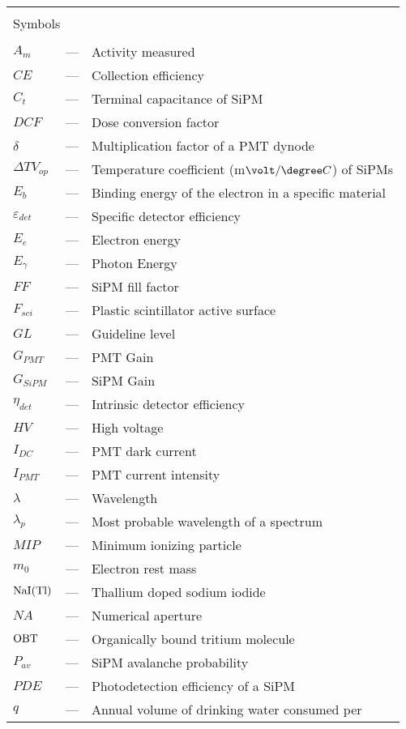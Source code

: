 \begin{longtable}{p{25mm} c p{120mm} }
\\
\\
\multicolumn{3}{l}{Symbols}\\
\\
$A_{m}$ & --- & Activity measured\\
$CE$ & --- & Collection efficiency\\
$C_t$ & --- & Terminal capacitance of SiPM\\
$DCF$ & --- & Dose conversion factor\\
$\delta$ & --- & Multiplication factor of a PMT dynode\\
$\Delta TV_{op}$ & --- & Temperature coefficient (m$\volt/\degree C$) of SiPMs\\
$E_b$ & --- & Binding energy of the electron in a specific material\\
$\varepsilon_{det}$ & --- & Specific detector efficiency\\
$E_e$ & --- & Electron energy\\
$E_\gamma$ & --- & Photon Energy\\
$FF$ & --- & SiPM fill factor\\
$F_{sci}$ & --- & Plastic scintillator active surface\\
$GL$ & --- & Guideline level\\
$G_{PMT}$ & --- & PMT Gain\\
$G_{SiPM}$ & --- & SiPM Gain\\
$\eta_{det}$ & --- & Intrinsic detector efficiency\\
$HV$ & --- & High voltage\\
$I_{DC}$ & --- & PMT dark current\\
$I_{PMT}$ & --- & PMT current intensity\\
$\lambda$ & --- & Wavelength\\
$\lambda_p$ & --- & Most probable wavelength of a spectrum\\
$MIP$ & --- & Minimum ionizing particle\\
$m_0$ & --- & Electron rest mass\\
$\ce{NaI(Tl)}$ & --- & Thallium doped sodium iodide\\
$NA$ & --- & Numerical aperture\\
$\ce{OBT}$ & --- & Organically bound tritium molecule\\
$P_{av}$ & --- & SiPM avalanche probability\\
$PDE$ & --- & Photodetection efficiency of a SiPM\\
$q$ & --- & Annual volume of drinking water consumed per 

\end{longtable}
